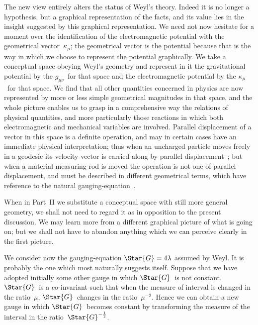 \documentclass[12pt]{book}
\begin{document}
The new view entirely alters the status of Weyl's theory. Indeed it is no
%
longer a hypothesis, but a graphical representation of the facts, and its value
lies in the insight suggested by this graphical representation. We need not
now hesitate for a moment over the identification of the electromagnetic
potential with the geometrical vector~$\kappa_{\mu}$; the geometrical vector is the
potential because that is the way in which we choose to represent the
potential graphically. We take a conceptual space obeying Weyl's geometry
and represent in it the gravitational potential by the $g_{\mu\nu}$~for that space and
the electromagnetic potential by the $\kappa_{\mu}$~for that space. We find that all
other quantities concerned in physics are now represented by more or less
simple geometrical magnitudes in that space, and the whole picture enables
us to grasp in a comprehensive way the relations of physical quantities,
and more particularly those reactions in which both electromagnetic and
mechanical variables are involved. Parallel displacement of a vector in this
space is a definite operation, and may in certain cases have an immediate
physical interpretation; thus when an uncharged particle moves freely in a
geodesic its velocity-vector is carried along by parallel displacement~;
but when a material measuring-rod is moved the operation is not one of
parallel displacement, and must be described in different geometrical terms,
which have reference to the natural gauging-equation~.

When in Part~II we substitute a conceptual space with still more general
geometry, we shall not need to regard it as in opposition to the present
discussion. We may learn more from a different graphical picture of what is
going on; but we shall not have to abandon anything which we can perceive
clearly in the first picture.

We consider now the gauging-equation $\Star{G} = 4\lambda$ assumed by Weyl. It is
probably the one which most naturally suggests itself. Suppose that we
have adopted initially some other gauge in which $\Star{G}$~is not constant. $\Star{G}$~is
a co-invariant such that when the measure of interval is changed in the ratio~$\mu$,
$\Star{G}$~changes in the ratio~$\mu^{-2}$. Hence we can obtain a new gauge in which
$\Star{G}$~becomes constant by transforming the measure of the interval in the
ratio~$\Star{G}^{-\frac{1}{2}}$.
\end{document}
